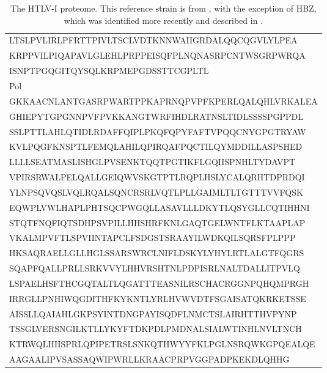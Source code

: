 \begin{table}[htp]
\begin{center}
\begin{tabulary}{\textwidth}{|L|}
LTSLPVLIRLPFRTTPIVLTSCLVDTKNNWAIIGRDALQQCQGVLYLPEA \\
KRPPVILPIQAPAVLGLEHLPRPPEISQFPLNQNASRPCNTWSGRPWRQA \\
ISNPTPGQGITQYSQLKRPMEPGDSSTTCGPLTL \bigstrut[b] \\
\hline
Pol \bigstrut[t] \\
GKKAACNLANTGASRPWARTPPKAPRNQPVPFKPERLQALQHLVRKALEA \bigstrut[t] \\
GHIEPYTGPGNNPVFPVKKANGTWRFIHDLRATNSLTIDLSSSSPGPPDL \\
SSLPTTLAHLQTIDLRDAFFQIPLPKQFQPYFAFTVPQQCNYGPGTRYAW \\
KVLPQGFKNSPTLFEMQLAHILQPIRQAFPQCTILQYMDDILLASPSHED \\
LLLLSEATMASLISHGLPVSENKTQQTPGTIKFLGQIISPNHLTYDAVPT \\
VPIRSRWALPELQALLGEIQWVSKGTPTLRQPLHSLYCALQRHTDPRDQI \\
YLNPSQVQSLVQLRQALSQNCRSRLVQTLPLLGAIMLTLTGTTTVVFQSK \\
EQWPLVWLHAPLPHTSQCPWGQLLASAVLLLDKYTLQSYGLLCQTIHHNI \\
STQTFNQFIQTSDHPSVPILLHHSHRFKNLGAQTGELWNTFLKTAAPLAP \\
VKALMPVFTLSPVIINTAPCLFSDGSTSRAAYILWDKQILSQRSFPLPPP \\
HKSAQRAELLGLLHGLSSARSWRCLNIFLDSKYLYHYLRTLALGTFQGRS \\
SQAPFQALLPRLLSRKVVYLHHVRSHTNLPDPISRLNALTDALLITPVLQ \\
LSPAELHSFTHCGQTALTLQGATTTEASNILRSCHACRGGNPQHQMPRGH \\
IRRGLLPNHIWQGDITHFKYKNTLYRLHVWVDTFSGAISATQKRKETSSE \\
AISSLLQAIAHLGKPSYINTDNGPAYISQDFLNMCTSLAIRHTTHVPYNP \\
TSSGLVERSNGILKTLLYKYFTDKPDLPMDNALSIALWTINHLNVLTNCH \\
KTRWQLHHSPRLQPIPETRSLSNKQTHWYYFKLPGLNSRQWKGPQEALQE \\
AAGAALIPVSASSAQWIPWRLLKRAACPRPVGGPADPKEKDLQHHG \bigstrut[b] \\
\hline
\end{tabulary}
\end{center}
\caption[The HTLV-I proteome]{The HTLV-I proteome. This reference strain is from \citep{Seiki1983}, with the exception of HBZ, which was identified more recently and described in \citep{Satou2006}.}\label{appendixc/table2}
\end{table}

